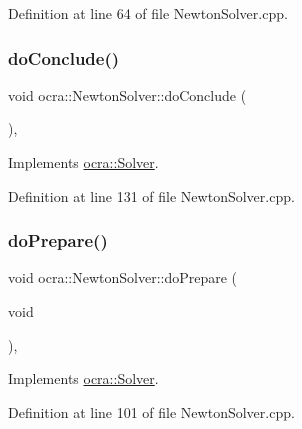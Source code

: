 Definition at line 64 of file Newton\+Solver.\+cpp.

\hypertarget{classocra_1_1NewtonSolver_ae356c90b0931d0cf3571039e52647ef4}{}\label{classocra_1_1NewtonSolver_ae356c90b0931d0cf3571039e52647ef4} 
\subsubsection{\texorpdfstring{do\+Conclude()}{doConclude()}}
{\footnotesize\ttfamily void ocra\+::\+Newton\+Solver\+::do\+Conclude (\begin{DoxyParamCaption}{ }\end{DoxyParamCaption})\hspace{0.3cm}{\ttfamily [protected]}, {\ttfamily [virtual]}}



Implements \hyperlink{classocra_1_1Solver_ac9d2d41d544b57a75e0d03db073d646e}{ocra\+::\+Solver}.



Definition at line 131 of file Newton\+Solver.\+cpp.

\hypertarget{classocra_1_1NewtonSolver_af717009e42a86f10a793f172883cc93d}{}\label{classocra_1_1NewtonSolver_af717009e42a86f10a793f172883cc93d} 
\subsubsection{\texorpdfstring{do\+Prepare()}{doPrepare()}}
{\footnotesize\ttfamily void ocra\+::\+Newton\+Solver\+::do\+Prepare (\begin{DoxyParamCaption}\item[{void}]{ }\end{DoxyParamCaption})\hspace{0.3cm}{\ttfamily [protected]}, {\ttfamily [virtual]}}



Implements \hyperlink{classocra_1_1Solver_a9ab90e87025e3da7239141c48d28ab4a}{ocra\+::\+Solver}.



Definition at line 101 of file Newton\+Solver.\+cpp.

\hypertarget{classocra_1_1NewtonSolver_ac49e1e33eb86cb15ac505e638c2fccb9}{}\label{classocra_1_1NewtonSolver_ac49e1e33eb86cb15ac505e638c2fccb9} 
